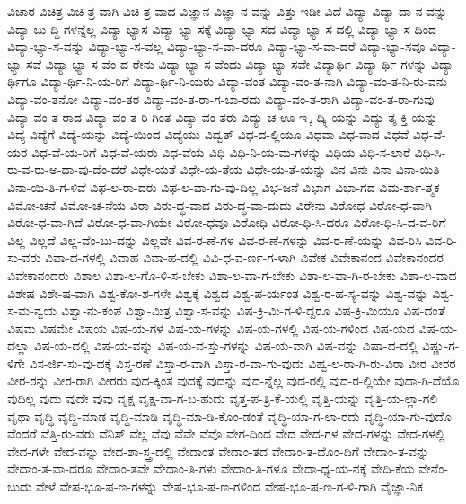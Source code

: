 {ವಿಚಾರ
ವಿಚಿತ್ರ
ವಿಚಿ-ತ್ರ-ವಾಗಿ
ವಿಚಿ-ತ್ರ-ವಾದ
ವಿಜ್ಞಾನ
ವಿಜ್ಞಾ-ನ-ವನ್ನು
ವಿತ್ತು-ಇಡೀ
ವಿದೆ
ವಿದ್ಯಾ
ವಿದ್ಯಾ-ದಾ-ನ-ವನ್ನು
ವಿದ್ಯಾ-ಬು-ದ್ಧಿ-ಗಳನ್ನೆಲ್ಲ
ವಿದ್ಯಾ-ಭ್ಯಾಸ
ವಿದ್ಯಾ-ಭ್ಯಾ-ಸಕ್ಕೆ
ವಿದ್ಯಾ-ಭ್ಯಾ-ಸದ
ವಿದ್ಯಾ-ಭ್ಯಾ-ಸ-ದಲ್ಲಿ
ವಿದ್ಯಾ-ಭ್ಯಾ-ಸ-ದಿಂದ
ವಿದ್ಯಾ-ಭ್ಯಾ-ಸ-ವನ್ನು
ವಿದ್ಯಾ-ಭ್ಯಾ-ಸ-ವಲ್ಲ
ವಿದ್ಯಾ-ಭ್ಯಾ-ಸ-ವಾ-ದರೂ
ವಿದ್ಯಾ-ಭ್ಯಾ-ಸ-ವಾ-ದರೆ
ವಿದ್ಯಾ-ಭ್ಯಾ-ಸವೂ
ವಿದ್ಯಾ-ಭ್ಯಾ-ಸವೆ
ವಿದ್ಯಾ-ಭ್ಯಾ-ಸ-ವೆಂ-ದ-ರೇನು
ವಿದ್ಯಾ-ಭ್ಯಾ-ಸ-ವೆಂದು
ವಿದ್ಯಾ-ಭ್ಯಾ-ಸವೇ
ವಿದ್ಯಾರ್ಥಿ
ವಿದ್ಯಾ-ರ್ಥಿ-ಗಳನ್ನು
ವಿದ್ಯಾ-ರ್ಥಿಗೂ
ವಿದ್ಯಾ-ರ್ಥಿ-ನಿ-ಯ-ರಿಗೆ
ವಿದ್ಯಾ-ರ್ಥಿ-ನಿ-ಯರು
ವಿದ್ಯಾ-ವಂತ
ವಿದ್ಯಾ-ವಂ-ತ-ನಾಗಿ
ವಿದ್ಯಾ-ವಂ-ತ-ನಿ-ರು-ವನು
ವಿದ್ಯಾ-ವಂ-ತನೋ
ವಿದ್ಯಾ-ವಂ-ತರ
ವಿದ್ಯಾ-ವಂ-ತ-ರಾ-ಗ-ಬಾ-ರದು
ವಿದ್ಯಾ-ವಂ-ತ-ರಾಗಿ
ವಿದ್ಯಾ-ವಂ-ತ-ರಾ-ಗುವು
ವಿದ್ಯಾ-ವಂ-ತ-ರಾದ
ವಿದ್ಯಾ-ವಂ-ತ-ರಿ-ಗಿಂತ
ವಿದ್ಯಾ-ವಂ-ತರು
ವಿದ್ಯು-ಚ-ಊ-ಇ-್ಕ-ದ್ಕ್ತಿ-ಯನ್ನು
ವಿದ್ಯು-ತ್ಶ-ಕ್ತಿ-ಯನ್ನು
ವಿದ್ಯೆ
ವಿದ್ಯೆಗೆ
ವಿದ್ಯೆ-ಯನ್ನು
ವಿದ್ಯೆ-ಯಿಂದ
ವಿದ್ಯೆಯು
ವಿದ್ವತ್
ವಿಧ-ದ-ಲ್ಲಿಯೂ
ವಿಧವಾ
ವಿಧ-ವಾದ
ವಿಧವೆ
ವಿಧ-ವೆ-ಯರ
ವಿಧ-ವೆ-ಯ-ರಿಗೆ
ವಿಧ-ವೆ-ಯರು
ವಿಧ-ವೆಯೆ
ವಿಧಿ
ವಿಧಿ-ನಿ-ಯ-ಮ-ಗಳನ್ನು
ವಿಧಿಯ
ವಿಧಿ-ಸ-ಲಾರೆ
ವಿಧಿ-ಸಿ-ರು-ವ-ರು-ಅ-ದಾ-ವು-ದೆಂ-ದರೆ
ವಿಧೇ-ಯತೆ
ವಿಧೇ-ಯ-ತೆಯ
ವಿಧೇ-ಯ-ತೆ-ಯನ್ನು
ವಿನ
ವಿನಃ
ವಿನಾ
ವಿನಾ-ಯಿತಿ
ವಿನಾ-ಯಿ-ತಿ-ಗ-ಳಿವೆ
ವಿಫ-ಲ-ರಾ-ದರು
ವಿಫ-ಲ-ವಾ-ಗು-ವು-ದಿಲ್ಲ
ವಿಭ-ಜನೆ
ವಿಭಾಗ
ವಿಭಾ-ಗದ
ವಿಮ-ರ್ಶಾ-ತ್ಮಕ
ವಿಮೋ-ಚನೆ
ವಿಮೋ-ಚ-ನೆಯ
ವಿರಾ
ವಿರು-ದ್ಧ-ವಾದ
ವಿರು-ದ್ಧ-ವಾ-ದುದು
ವಿರೇನು
ವಿರೋಧ
ವಿರೋ-ಧ-ವಾಗಿ
ವಿರೋ-ಧ-ವಾ-ಗಿದೆ
ವಿರೋ-ಧ-ವಾ-ಗಿಯೇ
ವಿರೋ-ಧವೂ
ವಿರೋಧಿ
ವಿರೋ-ಧಿ-ಸಿ-ದರೂ
ವಿರೋ-ಧಿ-ಸಿ-ದ-ವ-ರಿಗೆ
ವಿಲ್ಲ
ವಿಲ್ಲದೆ
ವಿಲ್ಲ-ವೆಂ-ಬು-ದನ್ನು
ವಿಲ್ಲವೇ
ವಿವ-ರ-ಣೆ-ಗಳ
ವಿವ-ರ-ಣೆ-ಗಳನ್ನು
ವಿವ-ರ-ಣೆ-ಯನ್ನು
ವಿವ-ರಿಸಿ
ವಿವ-ರಿ-ಸು-ವರು
ವಿವಾ-ದ-ಗಳಲ್ಲಿ
ವಿವಾಹ
ವಿವಾ-ಹ-ದಲ್ಲಿ
ವಿವಿ-ಧ-ವ-ರ್ಣ-ಗ-ಳಾಗಿ
ವಿವೇಕ
ವಿವೇಕಾನಂದ
ವಿವೇಕಾನಂದರ
ವಿವೇಕಾನಂದರು
ವಿಶಾಲ
ವಿಶಾ-ಲ-ಗೊ-ಳಿ-ಸ-ಬೇಕು
ವಿಶಾ-ಲ-ವಾ-ಗ-ಬೇಕು
ವಿಶಾ-ಲ-ವಾ-ಗಿ-ರ-ಬೇಕು
ವಿಶಾ-ಲ-ವಾದ
ವಿಶೇಷ
ವಿಶೇ-ಷ-ವಾಗಿ
ವಿಶ್ವ-ಕೋ-ಶ-ಗಳೇ
ವಿಶ್ವಕ್ಕೆ
ವಿಶ್ವದ
ವಿಶ್ವ-ಪ-ರ್ಯಂತ
ವಿಶ್ವ-ರ-ಹ-ಸ್ಯ-ವನ್ನು
ವಿಶ್ವ-ವನ್ನು
ವಿಶ್ವ-ಸ-ಮ-ನ್ವಯ
ವಿಶ್ವಾ-ನು-ಕಂಪ
ವಿಶ್ವಾ-ಮಿತ್ರ
ವಿಶ್ವಾ-ಸ-ವನ್ನು
ವಿಷ-ಕ್ರಿ-ಮಿ-ಗ-ಳಿ-ದ್ದರೂ
ವಿಷ-ಕ್ರಿ-ಮಿಯೂ
ವಿಷ-ದಂತೆ
ವಿಷಮ
ವಿಷಮೇ
ವಿಷಯ
ವಿಷ-ಯ-ಗಳ
ವಿಷ-ಯ-ಗಳನ್ನು
ವಿಷ-ಯ-ಗಳಲ್ಲಿ
ವಿಷ-ಯ-ಗಳಿಂದ
ವಿಷ-ಯದ
ವಿಷ-ಯ-ದಲ್ಲಾ
ವಿಷ-ಯ-ದಲ್ಲಿ
ವಿಷ-ಯ-ವನ್ನು
ವಿಷ-ಯ-ವ-ಸ್ತು-ಗಳನ್ನು
ವಿಷ-ಯ-ವಾಗಿ
ವಿಷ-ವನ್ನು
ವಿಷಾ-ದ-ದಲ್ಲಿ
ವಿಷ್ಣು-ಗ-ಳಿಗೇ
ವಿಸ-ರ್ಜಿ-ಸು-ವು-ದಕ್ಕೆ
ವಿಸ್ತ-ರಣೆ
ವಿಸ್ತಾ-ರ-ವಾಗಿ
ವಿಸ್ತಾ-ರ-ವಾ-ಗು-ವುದು
ವಿಹ್ವ-ಲ-ರಾ-ಗಿ-ರು-ವಿರಾ
ವೀರ
ವೀರರ
ವೀರ-ರನ್ನು
ವೀರ-ರಾಗಿ
ವೀರರು
ವುದ-ಕ್ಕಿಂತ
ವುದಕ್ಕೆ
ವುದನ್ನು
ವುದ-ನ್ನೆಲ್ಲ
ವುದ-ರಲ್ಲಿ
ವುದ-ರ-ಲ್ಲಿಯೇ
ವುದಾ-ಗಿ-ದೆಯೊ
ವುದಿಲ್ಲ
ವುದು
ವುದೇ
ವುವು
ವೃಕ್ಷ
ವೃಕ್ಷ-ವಾ-ಗ-ಬ-ಹುದು
ವೃತ್ತ-ಪ-ತ್ರಿ-ಕೆ-ಯಲ್ಲಿ
ವೃತ್ತಿ-ಯನ್ನು
ವೃತ್ತಿ-ಯ-ಲ್ಲಾ-ಗಲಿ
ವೃಥಾ
ವೃದ್ಧಿ
ವೃದ್ಧಿ-ಮಾಡ
ವೃದ್ಧಿ-ಮಾಡಿ
ವೃದ್ಧಿ-ಮಾ-ಡಿ-ಕೊಂ-ಡಂತೆ
ವೃದ್ಧಿ-ಯಾ-ಗ-ಲಾ-ರದು
ವೃದ್ಧಿ-ಯಾ-ಗು-ವುದೊ
ವೆಂದರೆ
ವೆತ್ತಿ-ರು-ವರು
ವೆನಿಸ್
ವೆಲ್ಲ
ವೆವು
ವೆವೇ
ವೆವೊ
ವೇಗ-ದಿಂದ
ವೇದ
ವೇದ-ಗಳ
ವೇದ-ಗಳನ್ನು
ವೇದ-ಗಳಲ್ಲಿ
ವೇದ-ಗಳೇ
ವೇದ-ವನ್ನು
ವೇದ-ಶಾ-ಸ್ತ್ರ-ದಲ್ಲಿ
ವೇದಾಂತ
ವೇದಾಂ-ತದ
ವೇದಾಂ-ತ-ದೊಂ-ದಿಗೆ
ವೇದಾಂ-ತ-ವನ್ನು
ವೇದಾಂ-ತ-ವಾ-ದರೂ
ವೇದಾಂ-ತವೇ
ವೇದಾಂ-ತಿ-ಗಳು
ವೇದಾಂ-ತಿ-ಗಳೂ
ವೇದಾ-ಧ್ಯ-ಯ-ನಕ್ಕೆ
ವೇದಿ-ಕೆಯ
ವೇನೆಂ-ಬುದು
ವೇಳೆ
ವೇಷ-ಭೂ-ಷ-ಣ-ಗಳನ್ನು
ವೇಷ-ಭೂ-ಷ-ಣ-ಗಳಿಂದ
ವೇಷ-ಭೂ-ಷ-ಣ-ಗ-ಳಿ-ಗಾಗಿ
ವೈಜ್ಞಾ-ನಿಕ
}
